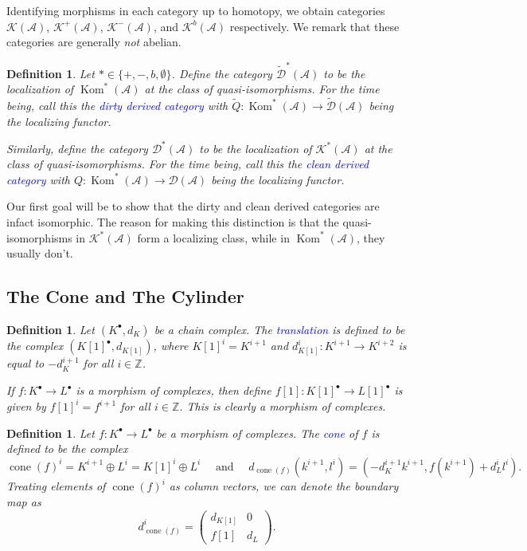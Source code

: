 \documentclass[11pt]{article}
\theoremstyle{thmstyle}
\theoremstyle{defstyle}
\newtheorem{definition}[theorem]{Definition}
\newcommand{\Z}{\mathbb{Z}}
\newcommand{\scrA}{\mathscr{A}}
\newcommand{\scrD}{\mathscr{D}}
\newcommand{\wt}[1]{\widetilde{#1}}
\newcommand{\define}[1]{\textcolor{blue}{\textit{#1}}}
\newcommand{\Kom}{\operatorname{Kom}}
\newcommand{\scrK}{\mathscr{K}}
\newcommand{\cone}{\operatorname{cone}}
\begin{document}
Identifying morphisms in each category up to homotopy, we obtain categories $\scrK(\scrA)$, $\scrK^+(\scrA)$, $\scrK^-(\scrA)$, and $\scrK^b(\scrA)$ respectively. We remark that these categories are generally \emph{not} abelian. 

\begin{definition}
	Let $\ast\in\{+, -, b, \emptyset\}$. Define the category $\wt\scrD^\ast(\scrA)$ to be the localization of $\Kom^\ast(\scrA)$ at the class of quasi-isomorphisms. For the time being, call this the \define{dirty derived category} with $\wt Q\colon\Kom^\ast(\scrA)\to\wt\scrD(\scrA)$ being the localizing functor.
	
	Similarly, define the category $\scrD^\ast(\scrA)$ to be the localization of $\scrK^\ast(\scrA)$ at the class of quasi-isomorphisms. For the time being, call this the \define{clean derived category} with $Q\colon\Kom^\ast(\scrA)\to\scrD(\scrA)$ being the localizing functor.
\end{definition}

\begin{mdframed}
	Our first goal will be to show that the dirty and clean derived categories are infact isomorphic. The reason for making this distinction is that the quasi-isomorphisms in $\scrK^\ast(\scrA)$ form a localizing class, while in $\Kom^\ast(\scrA)$, they usually don't.
\end{mdframed}

\subsection{The Cone and The Cylinder}

\begin{definition}
	Let $(K^\bullet, d_K)$ be a chain complex. The \define{translation} is defined to be the complex $\left(K[1]^\bullet, d_{K[1]}\right)$, where $K[1]^i = K^{i + 1}$ and $d^i_{K[1]}\colon K^{i + 1}\to K^{i + 2}$ is equal to $-d^{i + 1}_K$ for all $i\in\Z$.

	If $f\colon K^\bullet\to L^\bullet$ is a morphism of complexes, then define $f[1]\colon K[1]^\bullet\to L[1]^\bullet$ is given by $f[1]^i = f^{i + 1}$ for all $i\in\Z$. This is clearly a morphism of complexes.
\end{definition}

\begin{definition}
	Let $f\colon K^\bullet\to L^\bullet$ be a morphism of complexes. The \define{cone} of $f$ is defined to be the complex 
	\begin{equation*}
		\cone(f)^i = K^{i + 1}\oplus L^i = K[1]^i\oplus L^i\quad\text{ and }\quad d_{\cone(f)}\left(k^{i + 1}, l^i\right) = \left(-d_K^{i + 1}k^{i + 1}, f\left(k^{i + 1}\right) + d^i_Ll^i\right).
	\end{equation*}
	Treating elements of $\cone(f)^i$ as column vectors, we can denote the boundary map as 
	\begin{equation*}
		d_{\cone(f)}^i = 
		\begin{pmatrix}
			d_{K[1]} & 0\\
			f[1] & d_L
		\end{pmatrix}.
	\end{equation*}
\end{definition}
\end{document}
